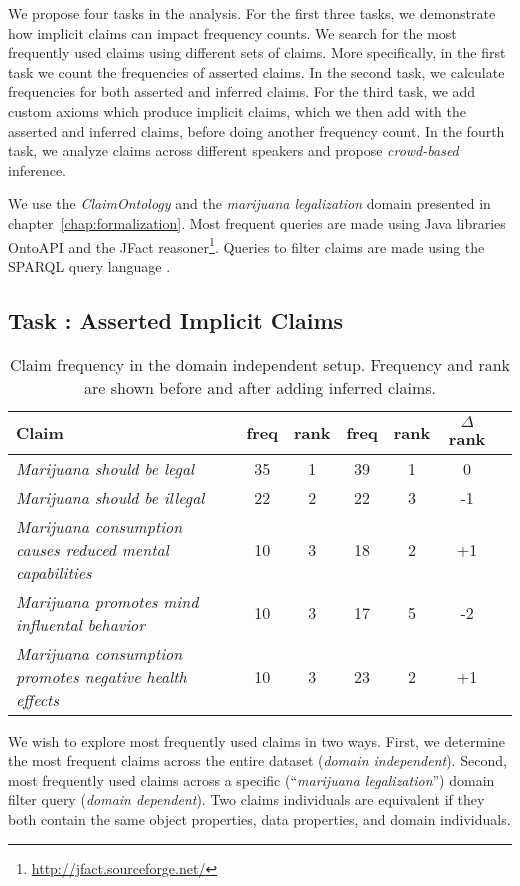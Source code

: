 We propose four tasks in the analysis. For the first three tasks, 
we demonstrate how implicit claims can impact frequency counts.
We search for the most frequently used claims using different sets
of claims. More specifically, in the first task we count 
the frequencies of asserted claims. In the second task, we 
calculate frequencies for both asserted and inferred
claims. For the third task, we add custom axioms which produce implicit claims,
which we then add with the asserted and inferred claims, before
doing another frequency count. In the fourth task, we analyze claims
across different speakers and propose \emph{crowd-based} inference.

We use the \emph{ClaimOntology} and the \emph{marijuana legalization} domain
presented in chapter~\ref{chap:formalization}. Most frequent queries 
are made using Java libraries OntoAPI \citep{bellatreche2007ontoapi} and 
the JFact reasoner\footnote{\url{http://jfact.sourceforge.net/}}.
Queries to filter claims are made using the SPARQL query language
\citep{perez2006semantics}.

\subsection{Task : Asserted Implicit Claims}

\begin{table*}[t]
\centering
\begin{tabular}{p{9 cm} | cc | cc | cc}
	\toprule
	\textbf{Claim} & freq & rank & freq & rank & $\Delta$rank \\
\midrule
	\emph{Marijuana should be legal 				}& 35 & 1 & 39 & 1 & 0 \\
	\emph{Marijuana should be illegal 				}& 22 & 2 & 22 & 3 & -1 \\
	\emph{Marijuana consumption causes reduced mental capabilities} & 10 & 3 & 18 & 2 & +1 \\
	\emph{Marijuana promotes mind influental behavior 		}& 10 & 3 & 17 & 5 & -2 \\
	\emph{Marijuana consumption promotes negative health effects 	}& 10 & 3 & 23 & 2 & +1 \\
\bottomrule 
\end{tabular}
\caption{Claim frequency in the domain independent setup. Frequency and rank are
	shown before and after adding inferred claims. }
\label{tab:claim_freq_indep}
\end{table*}

We wish to explore most frequently used claims in two ways.
First, we determine the most frequent claims across the entire dataset
(\emph{domain independent}).
Second, most frequently used claims across a specific 
(``\emph{marijuana legalization}'') domain filter query
(\emph{domain dependent}). 
Two claims individuals are equivalent if they both contain the same
object properties, data properties, and domain individuals. 

